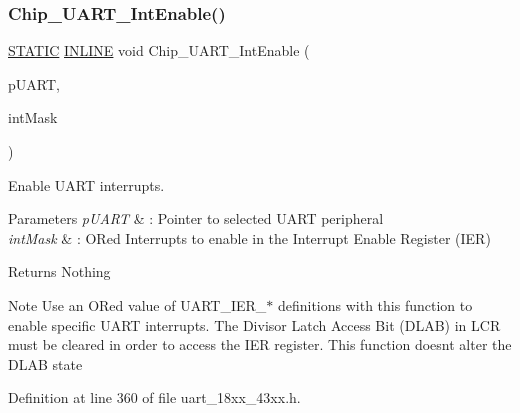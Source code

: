 \subsubsection{\texorpdfstring{Chip\+\_\+\+U\+A\+R\+T\+\_\+\+Int\+Enable()}{Chip\_UART\_IntEnable()}}
{\footnotesize\ttfamily \hyperlink{group___l_p_c___types___public___macros_ga10b2d890d871e1489bb02b7e70d9bdfb}{S\+T\+A\+T\+IC} \hyperlink{spifi__18xx__43xx_8h_a2eb6f9e0395b47b8d5e3eeae4fe0c116}{I\+N\+L\+I\+NE} void Chip\+\_\+\+U\+A\+R\+T\+\_\+\+Int\+Enable (\begin{DoxyParamCaption}\item[{\hyperlink{struct_l_p_c___u_s_a_r_t___t}{L\+P\+C\+\_\+\+U\+S\+A\+R\+T\+\_\+T} $\ast$}]{p\+U\+A\+RT,  }\item[{uint32\+\_\+t}]{int\+Mask }\end{DoxyParamCaption})}



Enable U\+A\+RT interrupts. 


\begin{DoxyParams}{Parameters}
{\em p\+U\+A\+RT} & \+: Pointer to selected U\+A\+RT peripheral \\
\hline
{\em int\+Mask} & \+: OR\textquotesingle{}ed Interrupts to enable in the Interrupt Enable Register (I\+ER) \\
\hline
\end{DoxyParams}
\begin{DoxyReturn}{Returns}
Nothing 
\end{DoxyReturn}
\begin{DoxyNote}{Note}
Use an OR\textquotesingle{}ed value of U\+A\+R\+T\+\_\+\+I\+E\+R\+\_\+$\ast$ definitions with this function to enable specific U\+A\+RT interrupts. The Divisor Latch Access Bit (D\+L\+AB) in L\+CR must be cleared in order to access the I\+ER register. This function doesn\textquotesingle{}t alter the D\+L\+AB state 
\end{DoxyNote}


Definition at line 360 of file uart\+\_\+18xx\+\_\+43xx.\+h.

\mbox{\label{group___u_a_r_t__18_x_x__43_x_x_ga8ab537af48951658e60af145690b656e}} 
